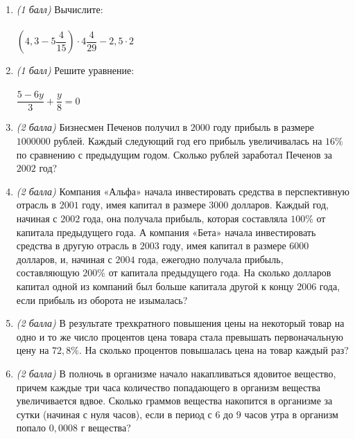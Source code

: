 \documentclass[12pt, a4paper]{article}
\begin{document}
	
	
	\begin{enumerate}
		\item \textit{(1 балл)} Вычислите:\\\\
		$\left( 4,3-5\dfrac{4}{15}\right)\cdot 4\dfrac{4}{29}-2,5\cdot 2 $
		\item \textit{(1 балл)} Решите уравнение:\\\\
		$\dfrac{5-6y}{3}+\dfrac{y}{8}=0$
		\item \textit{(2 балла)} Бизнесмен Печенов получил в $2000$ году прибыль в размере $1 000 000$ рублей. Каждый следующий год его прибыль увеличивалась на $16\%$ по сравнению с предыдущим годом. Сколько рублей заработал Печенов за $2002$ год?
		\item \textit{(2 балла)} Компания «Альфа» начала инвестировать средства в перспективную отрасль в $2001$ году, имея капитал в размере $3000$ долларов. Каждый год, начиная с $2002$ года, она получала прибыль, которая составляла $100\%$ от капитала предыдущего года. А компания «Бета» начала инвестировать средства в другую отрасль в $2003$ году, имея капитал в размере 6000 долларов, и, начиная с $2004$ года, ежегодно получала прибыль, составляющую $200\%$ от капитала предыдущего года. На сколько долларов капитал одной из компаний был больше капитала другой к концу $2006$ года, если прибыль из оборота не изымалась?
		\item \textit{(2 балла)} В результате трехкратного повышения цены на некоторый товар на одно и то же число процентов цена товара стала превышать первоначальную цену на $72,8\%$. На сколько процентов повышалась цена на товар каждый раз?
		\item \textit{(2 балла)} В полночь в организме начало накапливаться ядовитое вещество, причем каждые три часа количество попадающего в организм вещества увеличивается вдвое. Сколько граммов вещества накопится в организме за сутки (начиная с нуля часов), если в период с $6$ до $9$ часов утра в организм попало $0,0008$ г вещества?
	\end{enumerate}
\end{document}
